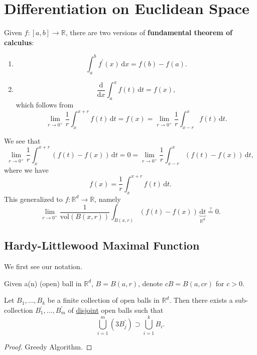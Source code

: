 \chapter{Differentiation on Euclidean Space}\label{ch:Differentiation-on-Euclidean-Space}
\begin{prev}
	Given \(f\colon [a, b]\to \mathbb{R} \), there are two versions of \textbf{fundamental theorem of calculus}:
	\begin{enumerate}[(1)]
		\item
		      \[
			      \int_{a}^{b} f^\prime (x) \,\mathrm{d}x = f(b) - f(a).
		      \]
		\item
		      \[
			      \frac{\mathrm{d}}{\mathrm{d}x} \int_{a}^{x} f(t) \,\mathrm{d}t = f(x),
		      \]
		      which follows from
		      \[
			      \lim\limits_{r \to 0^+} \frac{1}{r}\int_{x}^{x+r} f(t) \,\mathrm{d}t = f(x) = \lim\limits_{r \to 0^+} \frac{1}{r}\int_{x-r}^{x} f(t) \,\mathrm{d}t.
		      \]
	\end{enumerate}
\end{prev}
\begin{remark}
	We see that
	\[
		\lim\limits_{r \to 0^+} \frac{1}{r}\int_{x}^{x+r} \left(f(t)-f(x)\right) \,\mathrm{d}t = 0 = \lim\limits_{r \to 0^+} \frac{1}{r}\int_{x-r}^{x} \left(f(t)-f(x)\right) \,\mathrm{d}t,
	\]
	where we have
	\[
		f(x) = \frac{1}{r}\int_{x}^{x+r} f(t) \,\mathrm{d}t.
	\]
	This generalized to \(f\colon \mathbb{R} ^d\to \mathbb{R} \), namely
	\[
		\lim\limits_{r \to 0^+} \frac{1}{\mathrm{vol} \left(B(x, r)\right)}\int_{B(x, r)}\left(f(t)-f(x)\right)\,\underbrace{\mathrm{d}t}_{\mathbb{R} ^d} \overset{?}{=} 0.
	\]
\end{remark}
\section{Hardy-Littlewood Maximal Function}
We first see our notation.
\begin{notation}
	Given a(n) (open) ball in \(\mathbb{R} ^d\), \(B = B(a, r)\), denote \(cB = B(a, cr)\) for \(c>0\).
\end{notation}

\begin{lemma}\label{lma:Vitali-type-covering-lemma}
	Let \(B_1, \dots , B_k \) be a finite collection of open balls in \(\mathbb{R} ^d\). Then there
	exists a sub-collection \(B^\prime _1, \dots , B^\prime _m \) of \underline{disjoint} open balls such that
	\[
		\bigcup\limits_{i=1}^{m} \left(3 B_{j} ^\prime \right)\supset \bigcup\limits_{i=1}^{k} B_{i}.
	\]
\end{lemma}
\begin{proof}
	Greedy Algorithm.
\end{proof}
